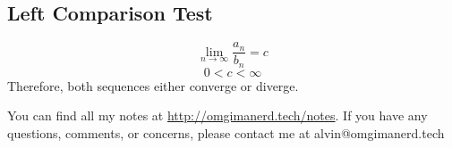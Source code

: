 \documentclass[letterpaper, 12pt]{math}
\begin{document}
\subsection*{Left Comparison Test}
\[ \lim_{n\to\infty}\frac{a_{n}}{b_{n}} = c \]
\[ 0 < c < \infty \]
Therefore, both sequences either converge or diverge.

\begin{center}
  You can find all my notes at \url{http://omgimanerd.tech/notes}. If you have
  any questions, comments, or concerns, please contact me at
  alvin@omgimanerd.tech
\end{center}
\end{document}
